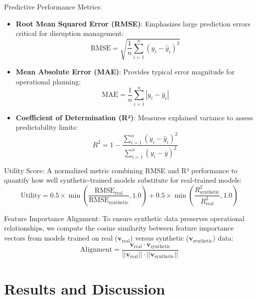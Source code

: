 \documentclass[conference]{IEEEtran}
\begin{document}
Predictive Performance Metrics:
\begin{itemize}
    \item \textbf{Root Mean Squared Error (RMSE)}: Emphasizes large prediction errors critical for disruption management:
    \begin{equation}
    \text{RMSE} = \sqrt{\frac{1}{n}\sum_{i=1}^{n}(y_i - \hat{y}_i)^2}
    \end{equation}
    
    \item \textbf{Mean Absolute Error (MAE)}: Provides typical error magnitude for operational planning:
    \begin{equation}
    \text{MAE} = \frac{1}{n}\sum_{i=1}^{n}|y_i - \hat{y}_i|
    \end{equation}
    
    \item \textbf{Coefficient of Determination (R²)}: Measures explained variance to assess predictability limits:
    \begin{equation}
    R^2 = 1 - \frac{\sum_{i=1}^{n}(y_i - \hat{y}_i)^2}{\sum_{i=1}^{n}(y_i - \bar{y})^2}
    \end{equation}
\end{itemize}

Utility Score: A normalized metric combining RMSE and R² performance to quantify how well synthetic-trained models substitute for real-trained models:
\begin{equation}
\text{Utility} = 0.5 \times \min\left(\frac{\text{RMSE}_{\text{real}}}{\text{RMSE}_{\text{synthetic}}}, 1.0\right) + 0.5 \times \min\left(\frac{R^2_{\text{synthetic}}}{R^2_{\text{real}}}, 1.0\right)
\end{equation}

Feature Importance Alignment:
To ensure synthetic data preserves operational relationships, we compute the cosine similarity between feature importance vectors from models trained on real ($\mathbf{v}_{\text{real}}$) versus synthetic ($\mathbf{v}_{\text{synthetic}}$) data:
\begin{equation}
\text{Alignment} = \frac{\mathbf{v}_{\text{real}} \cdot \mathbf{v}_{\text{synthetic}}}{||\mathbf{v}_{\text{real}}|| \cdot ||\mathbf{v}_{\text{synthetic}}||}
\end{equation}



\section{Results and Discussion}
\end{document}
